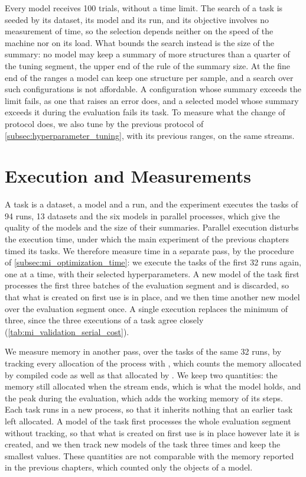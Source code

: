 Every model receives 100 trials, without a time limit. The search of a task is seeded by its dataset, its model and its run, and its objective involves no measurement of time, so the selection depends neither on the speed of the machine nor on its load. What bounds the search instead is the size of the summary: no model may keep a summary of more structures than a quarter of the tuning segment, the upper end of the rule of the summary size. At the fine end of the ranges a model can keep one structure per sample, and a search over such configurations is not affordable. A configuration whose summary exceeds the limit fails, as one that raises an error does, and a selected model whose summary exceeds it during the evaluation fails its task. To measure what the change of protocol does, we also tune \MicroTEDAClusPlus by the previous protocol of \cref{subsec:hyperparameter_tuning}, with its previous ranges, on the same streams.

\section{Execution and Measurements}
\label{sec:mod_measurements}

A task is a dataset, a model and a run, and the experiment executes the tasks of 94 runs, 13 datasets and the six models in parallel processes, which give the quality of the models and the size of their summaries. Parallel execution disturbs the execution time, under which the main experiment of the previous chapters timed its tasks. We therefore measure time in a separate pass, by the procedure of \cref{subsec:mi_optimization_time}: we execute the tasks of the first 32 runs again, one at a time, with their selected hyperparameters. A new model of the task first processes the first three batches of the evaluation segment and is discarded, so that what is created on first use is in place, and we then time another new model over the evaluation segment once. A single execution replaces the minimum of three, since the three executions of a task agree closely (\cref{tab:mi_validation_serial_cost}).

We measure memory in another pass, over the tasks of the same 32 runs, by tracking every allocation of the process with  \cite{memray}, which counts the memory allocated by compiled code as well as that allocated by . We keep two quantities: the memory still allocated when the stream ends, which is what the model holds, and the peak during the evaluation, which adds the working memory of its steps. Each task runs in a new process, so that it inherits nothing that an earlier task left allocated. A model of the task first processes the whole evaluation segment without tracking, so that what is created on first use is in place however late it is created, and we then track new models of the task three times and keep the smallest values. These quantities are not comparable with the memory reported in the previous chapters, which counted only the  objects of a model.

